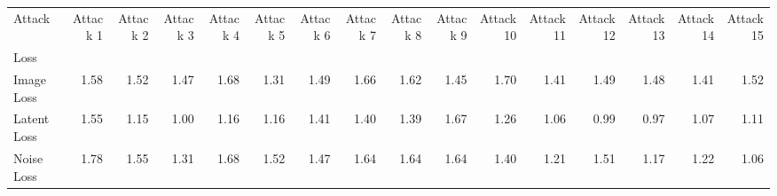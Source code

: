 \begin{tabular}{lrrrrrrrrrrrrrrr}
\toprule
Attack &  Attack 1 &  Attack 2 &  Attack 3 &  Attack 4 &  Attack 5 &  Attack 6 &  Attack 7 &  Attack 8 &  Attack 9 &  Attack 10 &  Attack 11 &  Attack 12 &  Attack 13 &  Attack 14 &  Attack 15 \\
Loss        &           &           &           &           &           &           &           &           &           &            &            &            &            &            &            \\
\midrule
Image Loss  &      1.58 &      1.52 &      1.47 &      1.68 &      1.31 &      1.49 &      1.66 &      1.62 &      1.45 &       1.70 &       1.41 &       1.49 &       1.48 &       1.41 &       1.52 \\
Latent Loss &      1.55 &      1.15 &      1.00 &      1.16 &      1.16 &      1.41 &      1.40 &      1.39 &      1.67 &       1.26 &       1.06 &       0.99 &       0.97 &       1.07 &       1.11 \\
Noise Loss  &      1.78 &      1.55 &      1.31 &      1.68 &      1.52 &      1.47 &      1.64 &      1.64 &      1.64 &       1.40 &       1.21 &       1.51 &       1.17 &       1.22 &       1.06 \\
\bottomrule
\end{tabular}
